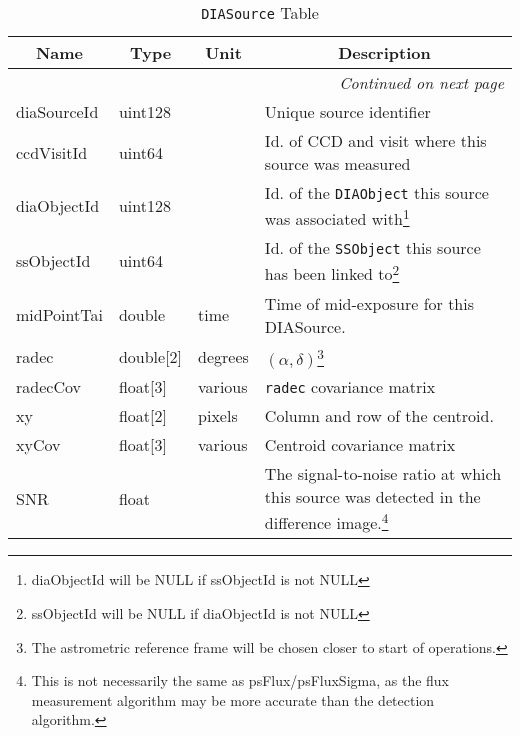 \documentclass[12pt]{article}
\newcommand{\code}[1]{\texttt{#1}}
\newcommand{\DIASource}{\code{DIASource}\xspace}
\newcommand{\DIAObject}{\code{DIAObject}\xspace}
\newcommand{\SSObject}{\code{SSObject}\xspace}
\begin{document}
\begin{center}
\begin{longtable}{p{3cm}p{2cm}p{2cm}p{5cm}}
\caption[\DIASource Table]{\DIASource Table
} \\

\hline \multicolumn{1}{c}{\bf Name} & \multicolumn{1}{c}{\bf Type} & \multicolumn{1}{c}{\bf Unit} & \multicolumn{1}{c}{\bf Description} \\ \hline
\endhead

\hline \multicolumn{4}{r}{{\em Continued on next page}} \\
\endfoot

\hline\hline
\endlastfoot

diaSourceId & uint128 & ~ & Unique source identifier \\ 

ccdVisitId & uint64 & ~ & Id. of CCD and visit where this source was measured \\ 

diaObjectId & uint128 & ~ & Id. of the \DIAObject this source was associated with\footnote{diaObjectId will be NULL if ssObjectId is not NULL} \\ 

ssObjectId & uint64 & ~ & Id. of the \SSObject this source has been linked to\footnote{ssObjectId will be NULL if diaObjectId is not NULL} \\ 

midPointTai & double & time & Time of mid-exposure for this DIASource. \\ 

radec & double[2] & degrees & $(\alpha, \delta)$\footnote{The astrometric reference frame will be chosen closer to start of operations.} \\ 

radecCov & float[3] & various & \texttt{radec} covariance matrix \\ 

xy & float[2] & pixels & Column and row of the centroid. \\ 

xyCov & float[3] & various & Centroid covariance matrix \\ 

SNR & float & ~ & The signal-to-noise ratio at which this source was detected in the difference image.\footnote{This is not necessarily the same as psFlux/psFluxSigma, as the flux measurement algorithm may be more accurate than the detection algorithm.} \\


\end{longtable}
\end{center}
\end{document}
